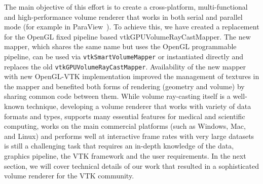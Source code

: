 The main objective of this effort is to create a cross-platform,
multi-functional and high-performance volume renderer that works in both serial
and parallel mode (for example in
ParaView~\citep{ahrens_paraview:_2005,ayachit_paraview_2015}). To achieve this,
we have created a replacement for the OpenGL fixed pipeline based
vtkGPUVolumeRayCastMapper. The new mapper, which shares the same name but uses
the OpenGL programmable pipeline, can be used via \texttt{vtkSmartVolumeMapper} or
instantiated directly and replaces the old \texttt{vtkGPUVolumeRayCastMapper}.
Availability of the new mapper with new OpenGL-VTK implementation improved the
management of textures in the mapper and benefited both forms of rendering
(geometry and volume) by sharing common code between them. While volume
ray-casting itself is a well-known technique, developing a volume renderer that
works with variety of data formats and types, supports many essential features
for medical and scientific computing, works on the main commercial platforms
(such as Windows, Mac, and Linux) and performs well at interactive frame rates
with very large datasets is still a challenging task that requires an in-depth
knowledge of the data, graphics pipeline, the VTK framework and the user
requirements.  In the next section, we will cover technical details of our work
that resulted in a sophisticated volume renderer for the VTK community.
